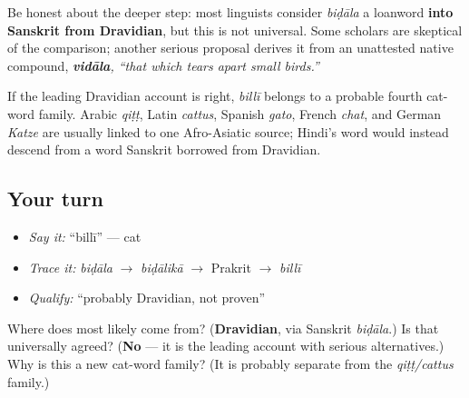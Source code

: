 Be honest about the deeper step: most linguists consider \emph{biḍāla} a loanword \textbf{into Sanskrit from Dravidian}, but this is not universal. Some scholars are skeptical of the comparison; another serious proposal derives it from an unattested native compound, \emph{\textbf{vidāla}, \textquotedblleft{}that which tears apart small birds.\textquotedblright{}}

If the leading Dravidian account is right, \emph{billī} belongs to a probable fourth cat-word family. Arabic \emph{qiṭṭ}, Latin \emph{cattus}, Spanish \emph{gato}, French \emph{chat}, and German \emph{Katze} are usually linked to one Afro-Asiatic source; Hindi's word would instead descend from a word Sanskrit borrowed from Dravidian.

\subsection*{Your turn}
\begin{itemize}
\raggedright
  \item \emph{Say it:} \textquotedblleft{}billī\textquotedblright{} — cat
  \item \emph{Trace it:} \emph{biḍāla} $\to$ \emph{biḍālikā} $\to$ Prakrit $\to$ \emph{billī}
  \item \emph{Qualify:} \textquotedblleft{}probably Dravidian, not proven\textquotedblright{}
\end{itemize}

\begin{tcolorbox}[breakable,colback=teal!4,colframe=teal!35!black,title={Before you move on}]
Where does \textbf{} most likely come from? (\textbf{Dravidian}, via Sanskrit \emph{biḍāla}.) Is that universally agreed? (\textbf{No} — it is the leading account with serious alternatives.) Why is this a new cat-word family? (It is probably separate from the \emph{qiṭṭ/cattus} family.)
\end{tcolorbox}
